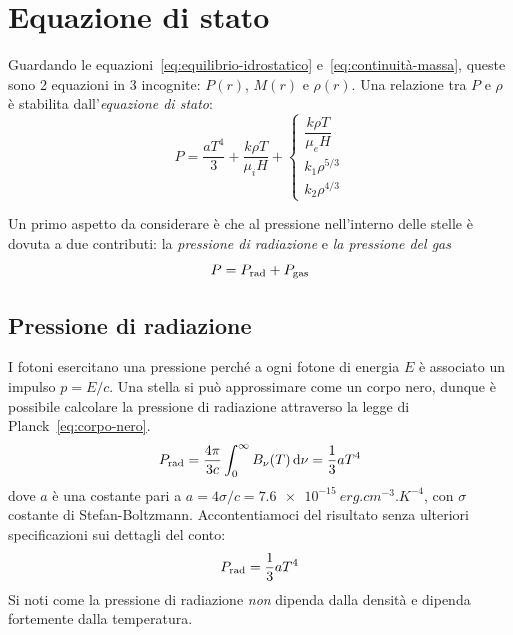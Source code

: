 \section{Equazione di stato}\label{sec:equazione-stato}
Guardando le equazioni~\eqref{eq:equilibrio-idrostatico} e~\eqref{eq:continuità-massa}, queste sono 2 equazioni in 3 incognite: $P(r)$, $M(r)$ e $\rho(r)$. Una relazione tra $P$ e $\rho$ è stabilita dall'\emph{equazione di stato}:
\begin{equation}\label{eq:equazione-stato}
    P = \dfrac{aT^4}{3} + \dfrac{k \rho T}{\mu_i H} + 
    \begin{cases} 
    \dfrac{k \rho T}{\mu_e H} \\ 
    k_1 \rho^{5/3} \\ 
    k_2 \rho^{4/3}
    \end{cases}
\end{equation}

Un primo aspetto da considerare è che al pressione nell'interno delle stelle è dovuta a due contributi: la \emph{pressione di radiazione} e \emph{la pressione del gas}
\[
P = P_\textup{rad} + P_\textup{gas}
\]
\subsection{Pressione di radiazione}
I fotoni esercitano una pressione perché a ogni fotone di energia $E$ è associato un impulso $p = E / c$. Una stella si può approssimare come un corpo nero, dunque è possibile calcolare la pressione di radiazione attraverso la legge di Planck~\eqref{eq:corpo-nero}.
\[
P_\textup{rad} = \frac{4\pi}{3c}\int_0^\infty B_\nu(T) \mathop{}\!\mathrm{d} \nu = \frac{1}{3} a T^4
\]
dove $a$ è una costante pari a $a = 4 \sigma / c = \SI{7.6e-15}{erg.cm^{-3}.K^{-4}}$, con $\sigma$ costante di Stefan-Boltzmann. Accontentiamoci del risultato senza ulteriori specificazioni sui dettagli del conto:
\begin{equation}\label{eq:pressione-radiazione}
    P_\textup{rad} = \frac{1}{3} a T^4
\end{equation}
Si noti come la pressione di radiazione \emph{non} dipenda dalla densità e dipenda fortemente dalla temperatura.

